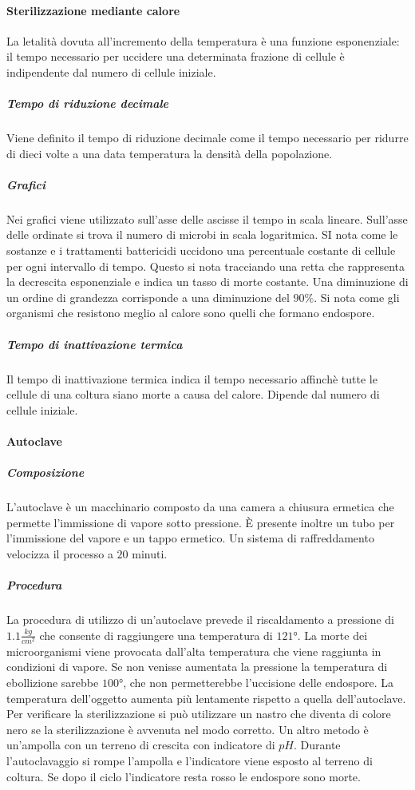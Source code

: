 			\paragraph{Sterilizzazione mediante calore}
			La letalit\`a dovuta all'incremento della temperatura \`e una funzione esponenziale: il tempo necessario per uccidere una determinata frazione di cellule \`e indipendente dal numero di cellule iniziale.
			
				\subparagraph{Tempo di riduzione decimale}
				Viene definito il tempo di riduzione decimale come il tempo necessario per ridurre di dieci volte a una data temperatura la densit\`a della popolazione.

				\subparagraph{Grafici}
				Nei grafici viene utilizzato sull'asse delle ascisse il tempo in scala lineare.
				Sull'asse delle ordinate si trova il numero di microbi in scala logaritmica.
				SI nota come le sostanze e i trattamenti battericidi uccidono una percentuale costante di cellule per ogni intervallo di tempo.
				Questo si nota tracciando una retta che rappresenta la decrescita esponenziale e indica un tasso di morte costante.
				Una diminuzione di un ordine di grandezza corrisponde a una diminuzione del $90\%$.
				Si nota come gli organismi che resistono meglio al calore sono quelli che formano endospore.

				\subparagraph{Tempo di inattivazione termica}
				Il tempo di inattivazione termica indica il tempo necessario affinch\`e tutte le cellule di una coltura siano morte a causa del calore.
				Dipende dal numero di cellule iniziale.

			\paragraph{Autoclave}

				\subparagraph{Composizione}
				L'autoclave \`e un macchinario composto da una camera a chiusura ermetica che permette l'immissione di vapore sotto pressione.
				\`E presente inoltre un tubo per l'immissione del vapore e un tappo ermetico.
				Un sistema di raffreddamento velocizza il processo a $20$ minuti.

				\subparagraph{Procedura}
				La procedura di utilizzo di un'autoclave prevede il riscaldamento a pressione di $1.1\frac{\si{kg}}{\si{cm^2}}$ che consente di raggiungere una temperatura di $121\si{\degree}$.
				La morte dei microorganismi viene provocata dall'alta temperatura che viene raggiunta in condizioni di vapore.
				Se non venisse aumentata la pressione la temperatura di ebollizione sarebbe $100\si{\degree}$, che non permetterebbe l'uccisione delle endospore.
				La temperatura dell'oggetto aumenta pi\`u lentamente rispetto a quella dell'autoclave.
				Per verificare la sterilizzazione si pu\`o utilizzare un nastro che diventa di colore nero se la sterilizzazione \`e avvenuta nel modo corretto.
				Un altro metodo \`e un'ampolla con un terreno di crescita con indicatore di $pH$.
				Durante l'autoclavaggio si rompe l'ampolla e l'indicatore viene esposto al terreno di coltura.
				Se dopo il ciclo l'indicatore resta rosso le endospore sono morte.
			

